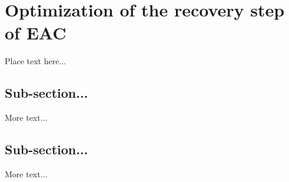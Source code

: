 
\section{Optimization of the recovery step of EAC}
\label{sec:imple}

Place text here...


\subsection{Sub-section...}

More text...


\subsection{Sub-section...}

More text...

